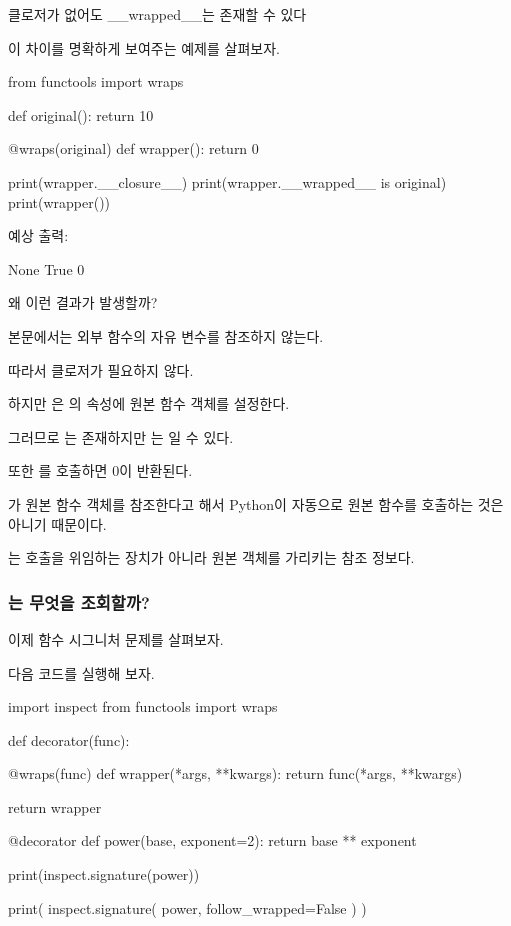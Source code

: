 \begin{dhknote}
\begin{dhksmry}[centered]
클로저가 없어도 __wrapped__는 존재할 수 있다
\end{dhksmry}
\end{dhknote}

이 차이를 명확하게 보여주는 예제를 살펴보자.

\begin{dhkcode}
from functools import wraps

def original():
    return 10


@wraps(original)
def wrapper():
    return 0


print(wrapper.__closure__)
print(wrapper.__wrapped__ is original)
print(wrapper())
\end{dhkcode}

예상 출력:

\begin{dhkzsh}
None
True
0
\end{dhkzsh}

왜 이런 결과가 발생할까?

 본문에서는 외부 함수의 자유 변수를 참조하지 않는다.

따라서 클로저가 필요하지 않다.

하지만 은 의  속성에 원본 함수 객체를 설정한다.

그러므로 는 존재하지만 는 일 수 있다.

또한 를 호출하면 0이 반환된다.

가 원본 함수 객체를 참조한다고 해서 Python이 자동으로 원본 함수를 호출하는 것은 아니기 때문이다.

는 호출을 위임하는 장치가 아니라 원본 객체를 가리키는 참조 정보다.

\subsubsection{는 무엇을 조회할까?}

이제 함수 시그니처 문제를 살펴보자.

다음 코드를 실행해 보자.

\begin{dhkcode}
import inspect
from functools import wraps

def decorator(func):

    @wraps(func)
    def wrapper(*args, **kwargs):
        return func(*args, **kwargs)

    return wrapper


@decorator
def power(base, exponent=2):
    return base ** exponent


print(inspect.signature(power))

print(
    inspect.signature(
        power,
        follow_wrapped=False
    )
)
\end{dhkcode}

